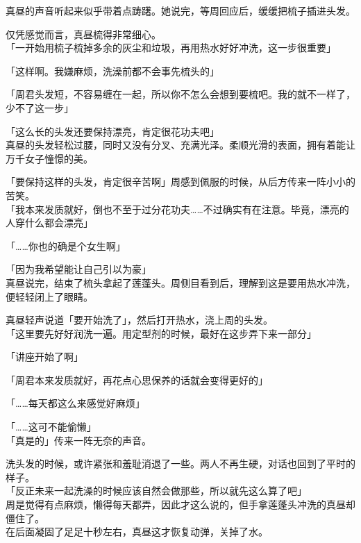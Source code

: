 真昼的声音听起来似乎带着点踌躇。她说完，等周回应后，缓缓把梳子插进头发。

仅凭感觉而言，真昼梳得非常细心。\\

「一开始用梳子梳掉多余的灰尘和垃圾，再用热水好好冲洗，这一步很重要」

「这样啊。我嫌麻烦，洗澡前都不会事先梳头的」

「周君头发短，不容易缠在一起，所以你不怎么会想到要梳吧。我的就不一样了，少不了这一步」

「这么长的头发还要保持漂亮，肯定很花功夫吧」\\

真昼的头发轻松过腰，同时又没有分叉、充满光泽。柔顺光滑的表面，拥有着能让万千女子憧憬的美。

「要保持这样的头发，肯定很辛苦啊」周感到佩服的时候，从后方传来一阵小小的苦笑。\\

「我本来发质就好，倒也不至于过分花功夫……不过确实有在注意。毕竟，漂亮的人穿什么都会漂亮」

「……你也的确是个女生啊」

「因为我希望能让自己引以为豪」\\

真昼说完，结束了梳头拿起了莲蓬头。周侧目看到后，理解到这是要用热水冲洗，便轻轻闭上了眼睛。

真昼轻声说道「要开始洗了」，然后打开热水，浇上周的头发。\\

「这里要先好好润洗一遍。用定型剂的时候，最好在这步弄下来一部分」

「讲座开始了啊」

「周君本来发质就好，再花点心思保养的话就会变得更好的」

「……每天都这么来感觉好麻烦」

「……这可不能偷懒」\\

「真是的」传来一阵无奈的声音。

洗头发的时候，或许紧张和羞耻消退了一些。两人不再生硬，对话也回到了平时的样子。\\

「反正未来一起洗澡的时候应该自然会做那些，所以就先这么算了吧」\\

周是觉得有点麻烦，懒得每天都弄，因此才这么说的，但手拿莲蓬头冲洗的真昼却僵住了。\\

在后面凝固了足足十秒左右，真昼这才恢复动弹，关掉了水。

